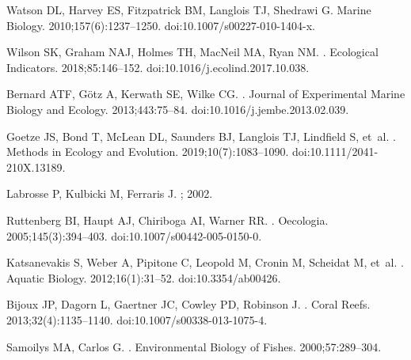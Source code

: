 \documentclass[10pt,letterpaper]{article}
\begin{document}
\begin{thebibliography}{10}
Watson DL, Harvey ES, Fitzpatrick BM, Langlois TJ, Shedrawi G.
\newblock Marine Biology. 2010;157(6):1237--1250.
\newblock doi:{10.1007/s00227-010-1404-x}.

Wilson SK, Graham NAJ, Holmes TH, MacNeil MA, Ryan NM.
.
\newblock Ecological Indicators. 2018;85:146--152.
\newblock doi:{10.1016/j.ecolind.2017.10.038}.

Bernard ATF, G{\"{o}}tz A, Kerwath SE, Wilke CG.
.
\newblock Journal of Experimental Marine Biology and Ecology. 2013;443:75--84.
\newblock doi:{10.1016/j.jembe.2013.02.039}.

Goetze JS, Bond T, McLean DL, Saunders BJ, Langlois TJ, Lindfield S, et~al.
.
\newblock Methods in Ecology and Evolution. 2019;10(7):1083--1090.
\newblock doi:{10.1111/2041-210X.13189}.

Labrosse P, Kulbicki M, Ferraris J.
; 2002.

Ruttenberg BI, Haupt AJ, Chiriboga AI, Warner RR.
.
\newblock Oecologia. 2005;145(3):394--403.
\newblock doi:{10.1007/s00442-005-0150-0}.

Katsanevakis S, Weber A, Pipitone C, Leopold M, Cronin M, Scheidat M, et~al.
.
\newblock Aquatic Biology. 2012;16(1):31--52.
\newblock doi:{10.3354/ab00426}.

Bijoux JP, Dagorn L, Gaertner JC, Cowley PD, Robinson J.
.
\newblock Coral Reefs. 2013;32(4):1135--1140.
\newblock doi:{10.1007/s00338-013-1075-4}.

Samoilys MA, Carlos G.
.
\newblock Environmental Biology of Fishes. 2000;57:289--304.


\end{thebibliography}
\end{document}
